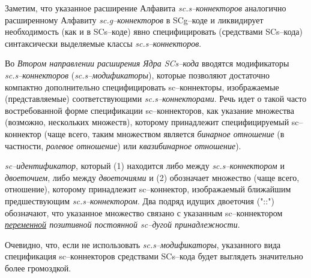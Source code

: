 Заметим, что указанное расширение Алфавита \textit{sc.s--коннекторов} аналогично расширенному Алфавиту \textit{sc.g--коннекторов} в SCg--коде и ликвидирует необходимость (как и в SCs--коде) явно специфицировать (средствами SCs--кода) синтаксически выделяемые классы \textit{sc.s--коннекторов}.



Во \textit{Втором направлении расширения Ядра SCs--кода} вводятся модификаторы \textit{sc.s--коннекторов} (\textit{\mbox{sc.s--модификаторы}}), которые позволяют достаточно компактно дополнительно специфицировать \mbox{sc--коннекторы}, изображаемые (представляемые) соответствующими \textit{sc.s--коннекторами}. Речь идет о такой часто востребованной форме спецификации sc--коннекторов, как указание множества (возможно, нескольких множеств), которому принадлежит специфицируемый  sc--коннектор (чаще всего, таким множеством является \textit{бинарное отношение} (в частности, \textit{ролевое отношение}) или \textit{квазибинарное отношение}).

\begin{SCn}
\begin{scnindent}
\end{scnindent}	
\textit{sc--идентификатор}, который (1) находится либо между \textit{sc.s--коннектором} и \textit{двоеточием}, либо между \textit{двоеточиями} и (2) обозначает множество (чаще всего, отношение), которому принадлежит sc--коннектор, изображаемый ближайшим предшествующим \textit{sc.s--коннектором}. Два подряд идущих двоеточия ("::"{}) обозначают, что указанное множество связано с указанным sc--коннектором \textit{\uline{переменной} позитивной постоянной sc--дугой принадлежности}.
\end{SCn}


Очевидно, что, если не использовать \textit{sc.s--модификаторы}, указанного вида спецификация sc--коннекторов средствами SCs--кода будет выглядеть значительно более громоздкой.

\begin{SCn}
\end{SCn}

